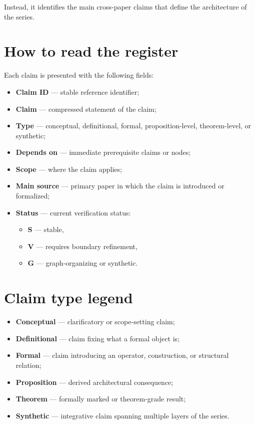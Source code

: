 \documentclass[11pt,a4paper]{article}
\begin{document}
	Instead, it identifies the main cross-paper claims that define the architecture of the series.
	
	\section{How to read the register}
	
	Each claim is presented with the following fields:
	
	\begin{itemize}[leftmargin=2em]
		\item \textbf{Claim ID} --- stable reference identifier;
		\item \textbf{Claim} --- compressed statement of the claim;
		\item \textbf{Type} --- conceptual, definitional, formal, proposition-level, theorem-level, or synthetic;
		\item \textbf{Depends on} --- immediate prerequisite claims or nodes;
		\item \textbf{Scope} --- where the claim applies;
		\item \textbf{Main source} --- primary paper in which the claim is introduced or formalized;
		\item \textbf{Status} --- current verification status:
		\begin{itemize}[leftmargin=2em]
			\item \textbf{S} --- stable,
			\item \textbf{V} --- requires boundary refinement,
			\item \textbf{G} --- graph-organizing or synthetic.
		\end{itemize}
	\end{itemize}
	
	\section{Claim type legend}
	
	\begin{itemize}[leftmargin=2em]
		\item \textbf{Conceptual} --- clarificatory or scope-setting claim;
		\item \textbf{Definitional} --- claim fixing what a formal object is;
		\item \textbf{Formal} --- claim introducing an operator, construction, or structural relation;
		\item \textbf{Proposition} --- derived architectural consequence;
		\item \textbf{Theorem} --- formally marked or theorem-grade result;
		\item \textbf{Synthetic} --- integrative claim spanning multiple layers of the series.
	\end{itemize}
	
\end{document}

